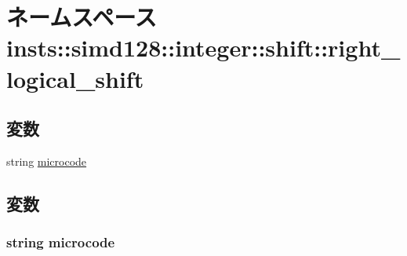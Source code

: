 \hypertarget{namespaceinsts_1_1simd128_1_1integer_1_1shift_1_1right__logical__shift}{
\section{ネームスペース insts::simd128::integer::shift::right\_\-logical\_\-shift}
\label{namespaceinsts_1_1simd128_1_1integer_1_1shift_1_1right__logical__shift}
}
\subsection*{変数}
\begin{DoxyCompactItemize}
\item 
string \hyperlink{namespaceinsts_1_1simd128_1_1integer_1_1shift_1_1right__logical__shift_a770f11a173e99389a8802f0107ed8f52}{microcode}
\end{DoxyCompactItemize}


\subsection{変数}
\hypertarget{namespaceinsts_1_1simd128_1_1integer_1_1shift_1_1right__logical__shift_a770f11a173e99389a8802f0107ed8f52}{
\subsubsection[{microcode}]{\setlength{\rightskip}{0pt plus 5cm}string {\bf microcode}}}
\label{namespaceinsts_1_1simd128_1_1integer_1_1shift_1_1right__logical__shift_a770f11a173e99389a8802f0107ed8f52}

